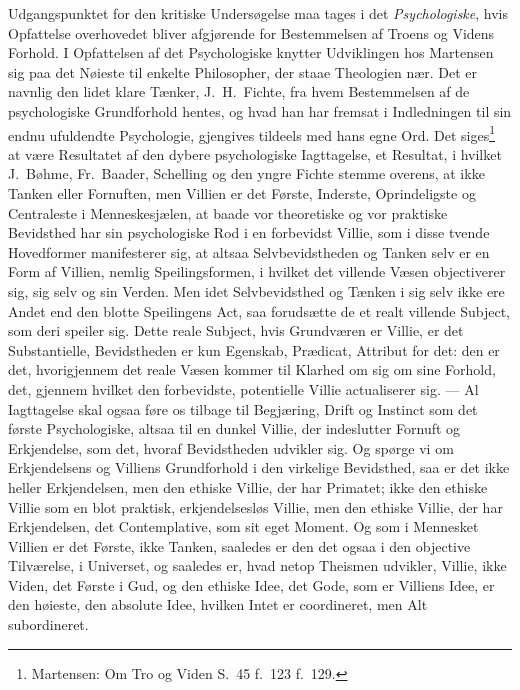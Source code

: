\documentclass[12pt,a4paper]{book}
\newcommand{\opage}[1]{\marginnote{\footnotesize\textit{[#1]}}}
\begin{document}
Udgangspunktet for den kritiske Undersøgelse maa tages i det \emph{Psychologiske}, hvis
Opfattelse overhovedet bliver afgjørende for Bestemmelsen af Troens og Videns
Forhold. I Opfattelsen af det Psychologiske knytter Udviklingen hos Martensen sig
paa det Nøieste til enkelte Philosopher, der staae Theologien nær. Det er
navnlig den lidet klare Tænker, J.\ H.\ Fichte, fra hvem Bestemmelsen af de
psychologiske Grundforhold hentes, og hvad han har fremsat i Indledningen til sin
endnu ufuldendte Psychologie, gjengives tildeels med hans egne Ord. Det
siges\footnote{Martensen: Om Tro og Viden S.\ 45 f.\ 123 f.\ 129.} at være
Resultatet af den dybere psychologiske Iagttagelse, et Resultat, i hvilket J.\
Bøhme, Fr.\ Baader, Schelling og den yngre Fichte stemme overens, at ikke Tanken
eller Fornuften, men Villien er det Første, Inderste, Oprindeligste og Centraleste
i Menneskesjælen, at baade vor theoretiske og vor praktiske Bevidsthed har sin
psychologiske Rod i en forbevidst Villie, som i disse tvende Hovedformer
manifesterer sig, at altsaa Selvbevidstheden og Tanken selv er en Form af Villien,
nemlig Speilingsformen, i hvilket det villende Væsen objectiverer sig, sig selv og
sin Verden. Men idet Selvbevidsthed og Tænken i sig selv ikke ere Andet end den
blotte Speilingens Act, saa forudsætte de et realt villende Subject, som deri
speiler sig. Dette reale Subject, hvis Grundværen er Villie, er det Substantielle,
Bevidstheden er kun Egenskab, Prædicat, Attribut for det: den er det, hvorigjennem
det \opage{51}reale Væsen kommer til Klarhed om sig om sine Forhold, det, gjennem hvilket den
forbevidste, potentielle Villie actualiserer sig. --- Al Iagttagelse skal ogsaa
føre os tilbage til Begjæring, Drift og Instinct som det første Psychologiske,
altsaa til en dunkel Villie, der indeslutter Fornuft og Erkjendelse, som det,
hvoraf Bevidstheden udvikler sig. Og spørge vi om Erkjendelsens og Villiens
Grundforhold i den virkelige Bevidsthed, saa er det ikke heller Erkjendelsen, men
den ethiske Villie, der har Primatet; ikke den ethiske Villie som en blot
praktisk, erkjendelsesløs Villie, men den ethiske Villie, der har Erkjendelsen,
det Contemplative, som sit eget Moment. Og som i Mennesket Villien er det Første,
ikke Tanken, saaledes er den det ogsaa i den objective Tilværelse, i Universet, og
saaledes er, hvad netop Theismen udvikler, Villie, ikke Viden, det Første i Gud, og
den ethiske Idee, det Gode, som er Villiens Idee, er den høieste, den absolute
Idee, hvilken Intet er coordineret, men Alt subordineret.
\end{document}
